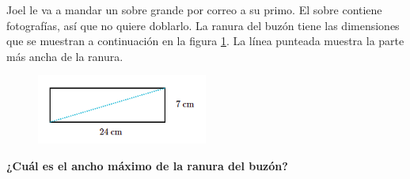 Joel le va a mandar un sobre grande por correo a su primo. El sobre contiene fotografías, así que no quiere doblarlo.
La ranura del buzón tiene las dimensiones que se muestran a continuación en la figura \ref{fig:proverb_pitagoras_02}. La línea punteada muestra la parte más ancha de la ranura.
\begin{figure}[H]
    \begin{center}
        \includegraphics[width=0.5\textwidth]{../images/proverb_pitagoras_02.png}
    \end{center}
    \caption{}
    \label{fig:proverb_pitagoras_02}
\end{figure}
\textbf{¿Cuál es el ancho máximo de la ranura del buzón?}